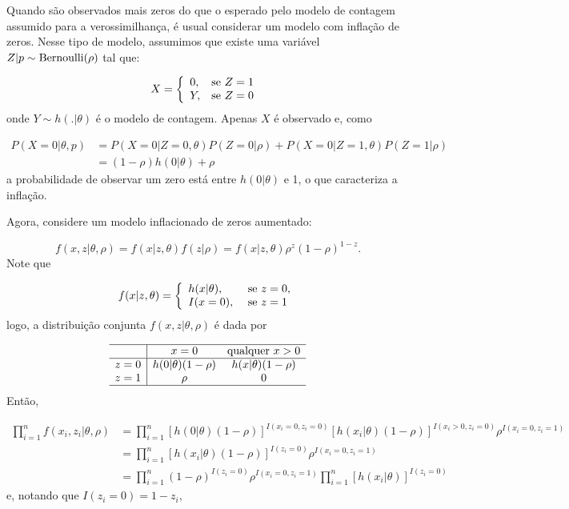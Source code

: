 \documentclass[
  letterpaper,
  DIV=11,
  numbers=noendperiod]{scrreprt}
\theoremstyle{plain}
\theoremstyle{definition}
\theoremstyle{definition}
\theoremstyle{remark}
\begin{document}
Quando são observados mais zeros do que o esperado pelo modelo de
contagem assumido para a verossimilhança, é usual considerar um modelo
com inflação de zeros. Nesse tipo de modelo, assumimos que existe uma
variável \(Z|p\sim\hbox{Bernoulli}(\rho)\) tal que:

\[X=\left\{\begin{array}{ll}0, & \hbox{se }Z=1\ \\ Y,&\hbox{se }Z=0\end{array}\right.\]
onde \(Y\sim h(.|\theta)\) é o modelo de contagem. Apenas \(X\) é
observado e, como

\[\begin{align}P(X=0|\theta,p)&=P(X=0|Z=0,\theta)P(Z=0|\rho)+P(X=0|Z=1,\theta)P(Z=1|\rho)\\&=(1-\rho)h(0|\theta)+\rho\end{align}\]
a probabilidade de observar um zero está entre \(h(0|\theta)\) e 1, o
que caracteriza a inflação.

Agora, considere um modelo inflacionado de zeros aumentado:

\[f(x,z|\theta,\rho)=f(x|z,\theta)f(z|\rho)=f(x|z,\theta)\rho^z(1-\rho)^{1-z}.\]
Note que

\[f(x|z,\theta)=\left\{
\begin{array}{ll}
h(x|\theta),&\hbox{ se }z=0,\\
I(x=0),&\hbox{ se }z=1\\
\end{array}\right.\] logo, a distribuição conjunta
\(f(x,z|\theta,\rho)\) é dada por

\[\begin{array}{c|cc}\hline & x=0 & \hbox{qualquer }x> 0 \\ \hline
z=0 & h(0|\theta)(1-\rho) & h(x|\theta)(1-\rho) \\
z=1 & \rho & 0 \\ \hline
\end{array}
\] Então,

\[\begin{align}
\prod_{i=1}^n f(x_i,z_i|\theta,\rho)&=\prod_{i=1}^n [h(0|\theta)(1-\rho)]^{I(x_i=0,z_i=0)}[h(x_i|\theta)(1-\rho)]^{I(x_i>0,z_i=0)}\rho^{I(x_i=0,z_i=1)}\\
&=\prod_{i=1}^n [h(x_i|\theta)(1-\rho)]^{I(z_i=0)}\rho^{I(x_i=0,z_i=1)}\\
&=\prod_{i=1}^n(1-\rho)^{I(z_i=0)}\rho^{I(x_i=0,z_i=1)}\prod_{i=1}^n [h(x_i|\theta)]^{I(z_i=0)}\end{align}\]
e, notando que \(I(z_i=0)=1-z_i,\)
\end{document}
